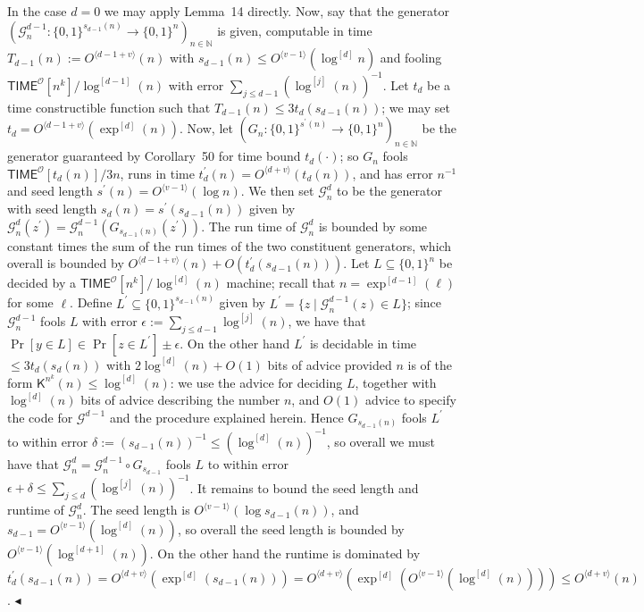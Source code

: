 \documentclass[10pt,a4paper]{article}
\begin{document}
In the case $d=0$ we may apply Lemma 14 directly. Now, say that the generator $(\mathcal{G}^{d-1}_{n}:\{0,1\}^{s_{d-1}(n)}\to\{0,1\}^{n})_{n\in\mathbb{N}}$ is given, computable in time $T_{d-1}(n):=O^{\langle d-1+v\rangle}(n)$ with $s_{d-1}(n)\leq O^{\langle v-1\rangle}(\log^{[d]}n)$ and fooling ${\mathsf{TIME}}^{\mathcal{O}}[n^{k}]/\log^{[d-1]}(n)$ with error $\sum_{j\leq d-1}(\log^{[j]}(n))^{-1}$. Let $t_{d}$ be a time constructible function such that $T_{d-1}(n)\leq 3t_{d}(s_{d-1}(n))$; we may set $t_{d}=O^{\langle d-1+v\rangle}(\exp^{[d]}(n))$. Now, let $(G_{n}:\{0,1\}^{s^{\prime}(n)}\to\{0,1\}^{n})_{n\in\mathbb{N}}$ be the generator guaranteed by Corollary 50 for time bound $t_{d}(\cdot)$; so $G_{n}$ fools ${\mathsf{TIME}}^{\mathcal{O}}[t_{d}(n)]/3n$, runs in time $t^{\prime}_{d}(n)=O^{\langle d+v\rangle}(t_{d}(n))$, and has error $n^{-1}$ and seed length $s^{\prime}(n)=O^{\langle v-1\rangle}(\log n)$. We then set $\mathcal{G}^{d}_{n}$ to be the generator with seed length $s_{d}(n)=s^{\prime}(s_{d-1}(n))$ given by $\mathcal{G}^{d}_{n}(z^{\prime})=\mathcal{G}_{n}^{d-1}(G_{s_{d-1}(n)}(z^{\prime}))$. The run time of $\mathcal{G}^{d}_{n}$ is bounded by some constant times the sum of the run times of the two constituent generators, which overall is bounded by $O^{\langle d-1+v\rangle}(n)+O(t^{\prime}_{d}(s_{d-1}(n)))$. Let $L\subseteq\{0,1\}^{n}$ be decided by a ${\mathsf{TIME}}^{\mathcal{O}}[n^{k}]/\log^{[d]}(n)$ machine; recall that $n=\exp^{[d-1]}(\ell)$ for some $\ell$. Define $L^{\prime}\subseteq\{0,1\}^{s_{d-1}(n)}$ given by $L^{\prime}=\{z\mid\mathcal{G}^{d-1}_{n}(z)\in L\}$; since $\mathcal{G}^{d-1}_{n}$ fools $L$ with error $\epsilon:=\sum_{j\leq d-1}\log^{[j]}(n)$, we have that $\Pr[y\in L]\in\Pr[z\in L^{\prime}]\pm\epsilon$. On the other hand $L^{\prime}$ is decidable in time $\leq 3t_{d}(s_{d}(n))$ with $2\log^{[d]}(n)+O(1)$ bits of advice provided $n$ is of the form ${\mathsf{K}}^{n^{k}}(n)\leq\log^{[d]}(n)$: we use the advice for deciding $L$, together with $\log^{[d]}(n)$ bits of advice describing the number $n$, and $O(1)$ advice to specify the code for $\mathcal{G}^{d-1}$ and the procedure explained herein. Hence $G_{s_{d-1}(n)}$ fools $L^{\prime}$ to within error $\delta:=(s_{d-1}(n))^{-1}\leq(\log^{[d]}(n))^{-1}$, so overall we must have that $\mathcal{G}^{d}_{n}=\mathcal{G}^{d-1}_{n}\circ G_{s_{d-1}}$ fools $L$ to within error $\epsilon+\delta\leq\sum_{j\leq d}(\log^{[j]}(n))^{-1}$. It remains to bound the seed length and runtime of $\mathcal{G}^{d}_{n}$. The seed length is $O^{\langle v-1\rangle}(\log s_{d-1}(n))$, and $s_{d-1}=O^{\langle v-1\rangle}(\log^{[d]}(n))$, so overall the seed length is bounded by $O^{\langle v-1\rangle}(\log^{[d+1]}(n))$. On the other hand the runtime is dominated by $t^{\prime}_{d}(s_{d-1}(n))=O^{\langle d+v\rangle}(\exp^{[d]}(s_{d-1}(n)))=O^{\langle d+v\rangle}(\exp^{[d]}(O^{\langle v-1\rangle}(\log^{[d]}(n))))\leq O^{\langle d+v\rangle}(n)$.
$\blacktriangleleft$
\par
\end{document}
